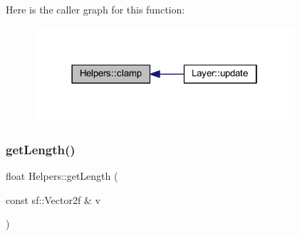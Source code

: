 Here is the caller graph for this function\+:
\nopagebreak
\begin{figure}[H]
\begin{center}
\leavevmode
\includegraphics[width=274pt]{namespace_helpers_acafe0d99760ee8ee1ffbd365f974cafe_icgraph}
\end{center}
\end{figure}
\mbox{\label{namespace_helpers_aad7d5773a24a3413ca8eca68aa6a872b}} 
\subsubsection{\texorpdfstring{get\+Length()}{getLength()}}
{\footnotesize\ttfamily float Helpers\+::get\+Length (\begin{DoxyParamCaption}\item[{const sf\+::\+Vector2f \&}]{v }\end{DoxyParamCaption})\hspace{0.3cm}{\ttfamily [inline]}}

